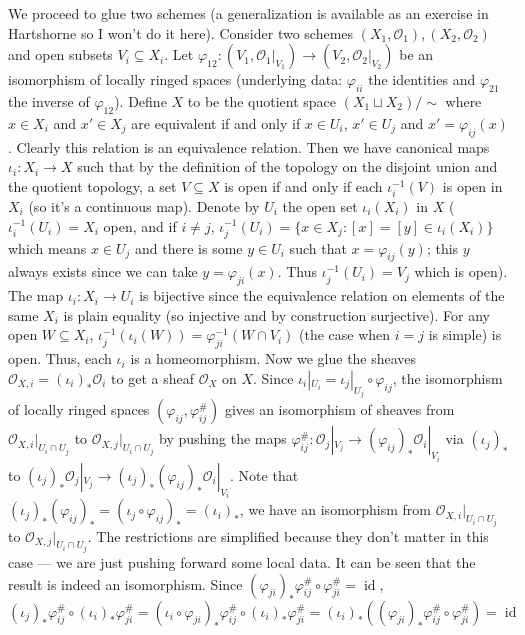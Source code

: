 \documentclass[12pt,letter]{article}
\newcommand{\id}[0]{\operatorname{id}}
\begin{document}
	We proceed to glue two schemes (a generalization is available as an exercise in Hartshorne so I won't do it here). Consider two schemes $(X_1,\mathscr O_1), (X_2, \mathscr O_2)$ and open subsets $V_i\subseteq X_i$. Let $\varphi_{12}: (V_1,\mathscr O_1|_{V_1})\to (V_2,\mathscr O_2|_{V_2})$ be an isomorphism of locally ringed spaces (underlying data: $\varphi_{ii}$ the identities and $\varphi_{21}$ the inverse of $\varphi_{12}$). Define $X$ to be the quotient space $(X_1\sqcup X_2)/\sim$ where $x\in X_i$ and $x'\in X_j$ are equivalent if and only if $x\in U_i$, $x'\in U_j$ and $x'=\varphi_{ij}(x)$. Clearly this relation is an equivalence relation. Then we have canonical maps $\iota_i:X_i\to X$ such that by the definition of the topology on the disjoint union and the quotient topology, a set $V\subseteq X$ is open if and only if each $\iota_i^{-1}(V)$ is open in $X_i$ (so it's a continuous map). Denote by $U_i$ the open set $\iota_i(X_i)$ in $X$ ($\iota_i^{-1}(U_i)=X_i$ open, and if $i\neq j$, $\iota_j^{-1}(U_i)=\{x\in X_j:[x]=[y]\in\iota_i(X_i)\}$ which means $x\in U_j$ and there is some $y\in U_i$ such that $x=\varphi_{ij}(y)$; this $y$ always exists since we can take $y=\varphi_{ji}(x)$. Thus $\iota_j^{-1}(U_i)=V_j$ which is open). The map $\iota_i:X_i\to U_i$ is bijective since the equivalence relation on elements of the same $X_i$ is plain equality (so injective and by construction surjective). For any open $W\subseteq X_i$, $\iota_j^{-1}(\iota_i(W))=\varphi_{ji}^{-1}(W\cap V_i)$ (the case when $i=j$ is simple) is open. Thus, each $\iota_i$ is a homeomorphism. Now we glue the sheaves $\mathscr O_{X, i}=\left(\iota_{i}\right)_*\mathscr O_i$ to get a sheaf $\mathscr O_X$ on $X$. Since $\iota_i|_{U_i}=\iota_{j}|_{U_j}\circ \varphi_{ij}$, the isomorphism of locally ringed spaces $(\varphi_{ij},\varphi_{ij}^\#)$ gives an isomorphism of sheaves from $\mathscr O_{X, i}|_{U_i\cap U_j}$ to $\mathscr O_{X, j}|_{U_i\cap U_j}$ by pushing the maps $\varphi_{ij}^\#:\mathscr O_j|_{V_j}\to(\varphi_{ij})_*\mathscr O_i|_{V_i}$ via $(\iota_j)_*$ to $(\iota_j)_*\mathscr O_j|_{V_j}\to(\iota_j)_*(\varphi_{ij})_*\mathscr O_i|_{V_i}$. Note that $(\iota_j)_*(\varphi_{ij})_*=(\iota_j\circ\varphi_{ij})_*=(\iota_i)_*$, we have an isomorphism from $\mathscr O_{X, i}|_{U_i\cap U_j}$ to $\mathscr O_{X, j}|_{U_i\cap U_j}$. The restrictions are simplified because they don't matter in this case --- we are just pushing forward some local data. It can be seen that the result is indeed an isomorphism. Since $(\varphi_{ji})_*\varphi_{ij}^\#\circ\varphi_{ji}^\#=\id$, 
	\[(\iota_j)_*\varphi_{ij}^\#\circ (\iota_i)_*\varphi_{ji}^\#=(\iota_i\circ\varphi_{ji})_*\varphi_{ij}^\#\circ (\iota_i)_*\varphi_{ji}^\#=(\iota_i)_*\left((\varphi_{ji})_*\varphi_{ij}^\#\circ\varphi_{ji}^\#\right)=\id\]
\end{document}

